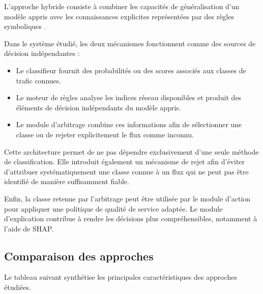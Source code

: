 L'approche hybride consiste à combiner les capacités de généralisation
d'un modèle appris avec les connaissances explicites représentées
par des règles symboliques \cite{garcez2023}. 

Dans le système étudié, les deux mécanismes fonctionnent comme
des sources de décision indépendantes :

\begin{itemize}
    \item Le classifieur fournit des probabilités ou des scores
    associés aux classes de trafic connues.
    
    \item Le moteur de règles analyse les indices réseau disponibles
    et produit des éléments de décision indépendants du modèle appris.
    
    \item Le module d'arbitrage combine ces informations afin de
    sélectionner une classe ou de rejeter explicitement le flux
    comme inconnu.
\end{itemize}

Cette architecture permet de ne pas dépendre exclusivement d'une
seule méthode de classification. Elle introduit également un
mécanisme de rejet afin d'éviter d'attribuer systématiquement
une classe connue à un flux qui ne peut pas être identifié de
manière suffisamment fiable.

Enfin, la classe retenue par l'arbitrage peut être utilisée par
le module d'action pour appliquer une politique de qualité de
service adaptée. Le module d'explication contribue à rendre
les décisions plus compréhensibles, notamment à l'aide de SHAP.

\subsection{Comparaison des approches}

Le tableau suivant synthétise les principales caractéristiques
des approches étudiées.

